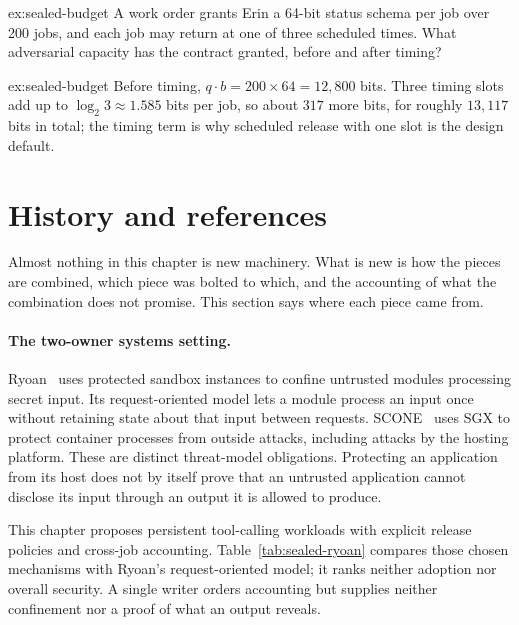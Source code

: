 \documentclass[11pt,a4paper]{article}
\theoremstyle{definition}
\begin{document}



\begin{pdexercise}[kind=Check,rating=1]{ex:sealed-budget}
A work order grants Erin a 64-bit status schema per job over 200 jobs, and each
job may return at one of three scheduled times. What adversarial capacity has
the contract granted, before and after timing?
\end{pdexercise}
\begin{pdsolution}{ex:sealed-budget}
Before timing, $q\cdot b=200\times64=12{,}800$ bits. Three timing slots add up
to $\log_2 3\approx1.585$ bits per job, so about $317$ more bits, for roughly
$13{,}117$ bits in total; the timing term is why scheduled release with one
slot is the design default.
\end{pdsolution}



\section{History and references}
\label{sec:sealed-history}

Almost nothing in this chapter is new machinery. What is new is how the
pieces are combined, which piece was bolted to which, and the accounting of
what the combination does not promise. This section says where each piece came from.

\paragraph{The two-owner systems setting.}
Ryoan~ uses protected sandbox instances to confine
untrusted modules processing secret input. Its request-oriented model lets a
module process an input once without retaining state about that input between
requests. SCONE~ uses SGX to protect container processes from
outside attacks, including attacks by the hosting platform. These are distinct
threat-model obligations. Protecting an application from its host does not
by itself prove that an untrusted application cannot disclose its input
through an output it is allowed to produce.

This chapter proposes persistent tool-calling workloads with explicit release
policies and cross-job accounting. Table~\ref{tab:sealed-ryoan} compares those
chosen mechanisms with Ryoan's request-oriented model; it ranks neither
adoption nor overall security. A single writer orders accounting but supplies
neither confinement nor a proof of what an output reveals.
\pdmarginpagebreak
\end{document}
